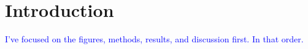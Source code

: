 \documentclass[draft]{agujournal2019}
\newcommand{\ijk}{\textcolor{blue}}
\begin{document}

%
%
%
%






\section{Introduction}\label{sec:intro}

\ijk{I've focused on the figures, methods, results, and discussion first. In that order.}

\end{document}
